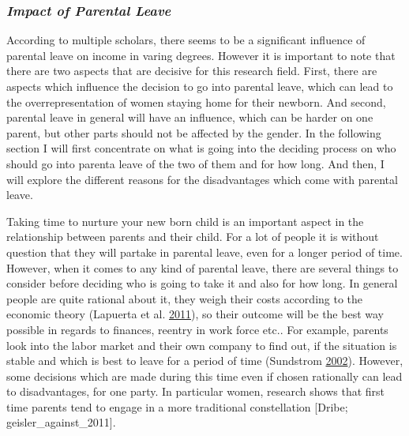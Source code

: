 \documentclass[
  12pt,
]{article}
\begin{document}
\hypertarget{impact-of-parental-leave}{%
\subsubsection*{\texorpdfstring{\emph{Impact of Parental Leave}}{Impact of Parental Leave}}\label{impact-of-parental-leave}}

According to multiple scholars, there seems to be a significant influence of parental leave on income in varing degrees.
However it is important to note that there are two aspects that are decisive for this research field. First, there are aspects which influence the decision to go into parental leave, which can lead to the overrepresentation of women staying home for their newborn. And second, parental leave in general will have an influence, which can be harder on one parent, but other parts should not be affected by the gender. In the following section I will first concentrate on what is going into the deciding process on who should go into parenta leave of the two of them and for how long. And then, I will explore the different reasons for the disadvantages which come with parental leave.

Taking time to nurture your new born child is an important aspect in the relationship between parents and their child. For a lot of people it is without question that they will partake in parental leave, even for a longer period of time. However, when it comes to any kind of parental leave, there are several things to consider before deciding who is going to take it and also for how long. In general people are quite rational about it, they weigh their costs according to the economic theory (Lapuerta et al. \protect\hyperlink{ref-lapuerta_individual_2011}{2011}), so their outcome will be the best way possible in regards to finances, reentry in work force etc.. For example, parents look into the labor market and their own company to find out, if the situation is stable and which is best to leave for a period of time (Sundstrom \protect\hyperlink{ref-sundstrom_gender_2002}{2002}). However, some decisions which are made during this time even if chosen rationally can lead to disadvantages, for one party. In particular women, research shows that first time parents tend to engage in a more traditional constellation {[}Dribe; geisler\_against\_2011{]}.
\end{document}
